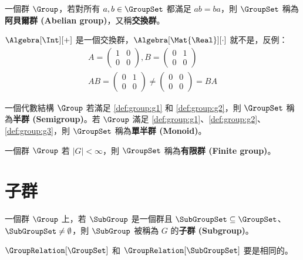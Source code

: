 \documentclass[12pt,a4paper,oneside]{report}
\begin{document}
\begin{CJK}{UTF8}{bkai}
\begin{mydef}[阿貝爾群]
\label{def:group:abelian_group}
一個群 $\Group$，若對所有 $a,b\in{\GroupSet}$ 都滿足 $ab=ba$，則 $\GroupSet$ 稱為\textbf{阿貝爾群 (Abelian group)}，又稱\textbf{交換群}。
\end{mydef}
\begin{myexample}
$\Algebra[\Int][+]$ 是一個交換群，$\Algebra[\Mat{\Real}][\cdot]$ 就不是，反例：
\begin{align*}
A=\left(\begin{array}{cc}
1 & 0\\
0 & 0
\end{array}\right),
B=\left(\begin{array}{cc}
0 & 1\\
0 & 0
\end{array}\right)\\
AB=\left(\begin{array}{cc}
0 & 1\\
0 & 0
\end{array}\right)\neq\left(\begin{array}{cc}
0 & 0\\
0 & 0
\end{array}\right)=BA
\end{align*}
\end{myexample}

\begin{mydef}[半群和單半群]
\label{def:group:semigroup_and_monoid}
一個代數結構 $\Group$ 若滿足 \ref{def:group:g1} 和 \ref{def:group:g2}，則 $\GroupSet$ 稱為\textbf{半群 (Semigroup)}。若 $\Group$ 滿足 \ref{def:group:g1}、\ref{def:group:g2}、\ref{def:group:g3}，則 $\GroupSet$ 稱為\textbf{單半群 (Monoid)}。
\end{mydef}

\begin{mydef}[有限群]
\label{def:group:finite_group}
一個群 $\Group$ 若 $|G|<\infty$，則 $\GroupSet$ 稱為\textbf{有限群 (Finite group)}。
\end{mydef}

\section{子群}

\begin{mydef}[子群]
\label{def:group:subgroup}
一個群 $\Group$ 上，若 $\SubGroup$ 是一個群且 $\SubGroupSet\subseteq{\GroupSet}$、$\SubGroupSet\neq{\emptyset}$，則 $\SubGroup$ 被稱為 $G$ 的\textbf{子群 (Subgroup)}。
\end{mydef}
\begin{mynote*}
$\GroupRelation[\GroupSet]$ 和 $\GroupRelation[\SubGroupSet]$ 要是相同的。
\end{mynote*}


\end{CJK}
\end{document}
